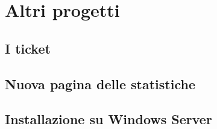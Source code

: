 \chapter{Altri progetti} \label{chap:altri_progetti}

    \section{I ticket} \label{sec:ap;ticket}
    
    \section{Nuova pagina delle statistiche} \label{sec:ap;nuova_pagina_statistiche}

    \section{Installazione su Windows Server} \label{sec:ap;installazione_windows_server}
